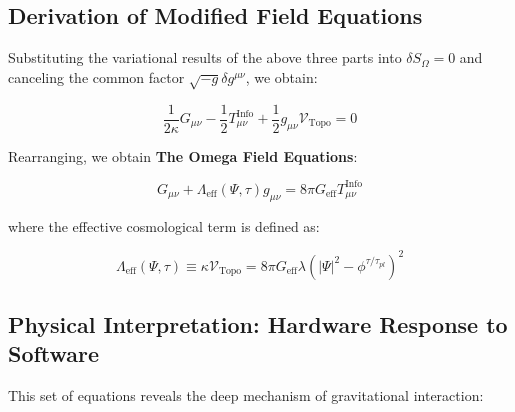 \subsection{Derivation of Modified Field Equations}

Substituting the variational results of the above three parts into $\delta S_{\Omega} = 0$ and canceling the common factor $\sqrt{-g} \delta g^{\mu\nu}$, we obtain:

\[\frac{1}{2\kappa} G_{\mu\nu} - \frac{1}{2} T_{\mu\nu}^{\text{Info}} + \frac{1}{2} g_{\mu\nu} \mathcal{V}_{\text{Topo}} = 0\]

Rearranging, we obtain \textbf{The Omega Field Equations}:

\[G_{\mu\nu} + \Lambda_{\text{eff}}(\Psi, \tau) g_{\mu\nu} = 8\pi G_{\text{eff}} T_{\mu\nu}^{\text{Info}}\]

where the effective cosmological term is defined as:

\[\Lambda_{\text{eff}}(\Psi, \tau) \equiv \kappa \mathcal{V}_{\text{Topo}} = 8\pi G_{\text{eff}} \lambda \left( |\Psi|^2 - \phi^{\tau/\tau_{pl}} \right)^2\]

\subsection{Physical Interpretation: Hardware Response to Software}

This set of equations reveals the deep mechanism of gravitational interaction:

